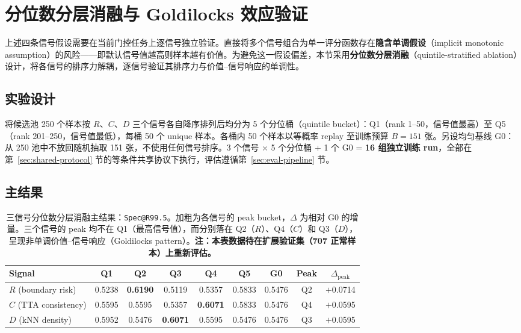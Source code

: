 \documentclass[UTF8,openany,12pt]{ctexbook}
\newcommand{\formalmetric}[1]{\texttt{#1}}
\begin{document}

\section{分位数分层消融与 Goldilocks 效应验证}
\label{sec:bucket-pilot}

上述四条信号假设需要在当前门控任务上逐信号独立验证。直接将多个信号组合为单一评分函数存在\textbf{隐含单调假设}（implicit monotonic assumption）的风险——即默认信号值越高则样本越有价值。为避免这一假设偏差，本节采用\textbf{分位数分层消融}（quintile-stratified ablation）设计，将各信号的排序力解耦，逐信号验证其排序力与价值--信号响应的单调性。

\subsection{实验设计}

将候选池 250 个样本按 $R$、$C$、$D$ 三个信号各自降序排列后均分为 5 个分位桶（quintile bucket）：Q1（rank 1--50，信号值最高）至 Q5（rank 201--250，信号值最低），每桶 50 个 unique 样本。各桶内 50 个样本以等概率 replay 至训练预算 $B = 151$ 张。另设均匀基线 G0：从 250 池中不放回随机抽取 151 张，不使用任何信号排序。3 个信号 $\times$ 5 个分位桶 + 1 个 G0 = \textbf{16 组独立训练 run}，全部在第~\ref{sec:shared-protocol} 节的等条件共享协议下执行，评估遵循第~\ref{sec:eval-pipeline} 节。

\subsection{主结果}

\begin{table}[H]
    \centering
    \caption{三信号分位数分层消融主结果：\formalmetric{Spec@R99.5}。加粗为各信号的 peak bucket，$\Delta$ 为相对 G0 的增量。三个信号的 peak 均不在 Q1（最高信号值），而分别落在 Q2（$R$）、Q4（$C$）和 Q3（$D$），呈现非单调价值--信号响应（Goldilocks pattern）。\textbf{注：本表数据待在扩展验证集（707 正常样本）上重新评估。}}
    \label{tab:bucket-pilot-main}
    \begin{tabular}{lcccccc|cc}
        \toprule
        Signal & Q1 & Q2 & Q3 & Q4 & Q5 & G0 & Peak & $\Delta_\mathrm{peak}$ \\
        \midrule
        $R$ (boundary risk) & 0.5238 & \textbf{0.6190} & 0.5119 & 0.5357 & 0.5833 & 0.5476 & Q2 & $+$0.0714 \\
        $C$ (TTA consistency) & 0.5595 & 0.5595 & 0.5357 & \textbf{0.6071} & 0.5833 & 0.5476 & Q4 & $+$0.0595 \\
        $D$ (kNN density) & 0.5952 & 0.5476 & \textbf{0.6071} & 0.5595 & 0.5476 & 0.5476 & Q3 & $+$0.0595 \\
        \bottomrule
    \end{tabular}
\end{table}
\end{document}
